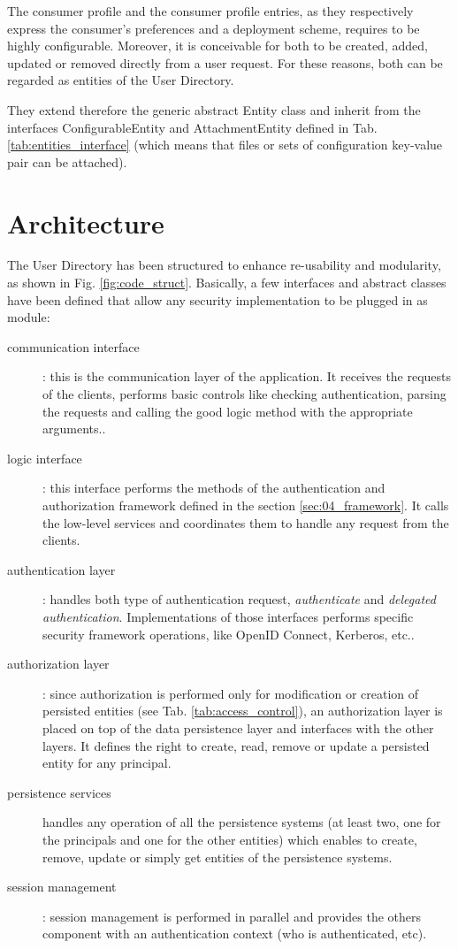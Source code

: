The consumer profile and the consumer profile entries, as they respectively express the consumer's preferences and a deployment scheme, requires to be highly configurable. Moreover, it is conceivable for both to be created, added, updated or removed directly from a user request. For these reasons, both can be regarded as entities of the User Directory.

They extend therefore the generic abstract Entity class and inherit  from the interfaces ConfigurableEntity and AttachmentEntity defined in Tab. \ref{tab:entities_interface} (which means that files or sets of configuration key-value pair can be attached).

\section{Architecture}
The User Directory has been structured to enhance re-usability and modularity, as shown in Fig. \ref{fig:code_struct}. Basically, a few interfaces and abstract classes have been defined that allow any security implementation to be plugged in as module:

\begin{description}
	\item[communication interface]: this is the communication layer of the application. It receives the requests of the clients, performs basic controls like checking authentication, parsing the requests and calling the good logic method with the appropriate arguments..\\
	\item[logic interface]: this interface performs the methods of the authentication and authorization framework defined  in the section \ref{sec:04_framework}. It calls the low-level services and coordinates them to handle any request from the clients.\\
	\item[authentication layer]: handles both type of authentication request, \textit{authenticate} and \textit{delegated authentication}. Implementations of those interfaces performs specific security framework operations, like OpenID Connect, Kerberos, etc..\\
	\item[authorization layer]: since authorization is  performed only for modification or creation of persisted entities (see Tab. \ref{tab:access_control}), an authorization layer is placed on top of the data persistence layer and interfaces with the other layers. It defines the right to create, read, remove or update a persisted entity for any principal. \\
	\item[persistence services] handles any operation of all the persistence systems (at least two, one for the principals and one for the other entities) which enables to create, remove, update or simply get entities of the persistence systems.\\
	\item[session management]: session management is performed in parallel and provides the others component with an authentication context (who is authenticated, etc).
\end{description}


